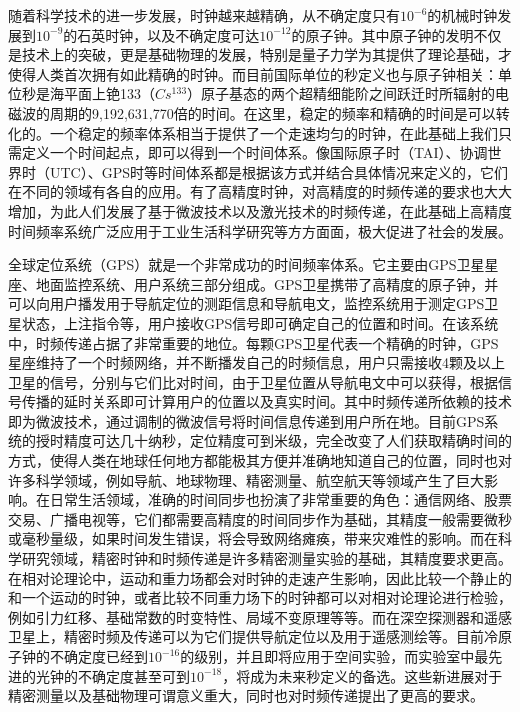 随着科学技术的进一步发展，时钟越来越精确，从不确定度只有$10^{-6}$的机械时钟发展到$10^{-9}$的石英时钟，以及不确定度可达$10^{-12}$的原子钟。其中原子钟的发明不仅是技术上的突破，更是基础物理的发展，特别是量子力学为其提供了理论基础，才使得人类首次拥有如此精确的时钟。而目前国际单位的秒定义也与原子钟相关：单位秒是海平面上铯133（$Cs^{133}$）原子基态的两个超精细能阶之间跃迁时所辐射的电磁波的周期的9,192,631,770倍的时间。在这里，稳定的频率和精确的时间是可以转化的。一个稳定的频率体系相当于提供了一个走速均匀的时钟，在此基础上我们只需定义一个时间起点，即可以得到一个时间体系。像国际原子时（TAI）、协调世界时（UTC）、GPS时等时间体系都是根据该方式并结合具体情况来定义的，它们在不同的领域有各自的应用。有了高精度时钟，对高精度的时频传递的要求也大大增加，为此人们发展了基于微波技术以及激光技术的时频传递，在此基础上高精度时间频率系统广泛应用于工业生活科学研究等方方面面，极大促进了社会的发展。

全球定位系统（GPS）就是一个非常成功的时间频率体系。它主要由GPS卫星星座、地面监控系统、用户系统三部分组成。GPS卫星携带了高精度的原子钟，并可以向用户播发用于导航定位的测距信息和导航电文，监控系统用于测定GPS卫星状态，上注指令等，用户接收GPS信号即可确定自己的位置和时间。在该系统中，时频传递占据了非常重要的地位。每颗GPS卫星代表一个精确的时钟，GPS星座维持了一个时频网络，并不断播发自己的时频信息，用户只需接收4颗及以上卫星的信号，分别与它们比对时间，由于卫星位置从导航电文中可以获得，根据信号传播的延时关系即可计算用户的位置以及真实时间。其中时频传递所依赖的技术即为微波技术，通过调制的微波信号将时间信息传递到用户所在地。目前GPS系统的授时精度可达几十纳秒，定位精度可到米级，完全改变了人们获取精确时间的方式，使得人类在地球任何地方都能极其方便并准确地知道自己的位置，同时也对许多科学领域，例如导航、地球物理、精密测量、航空航天等领域产生了巨大影响。在日常生活领域，准确的时间同步也扮演了非常重要的角色：通信网络、股票交易、广播电视等，它们都需要高精度的时间同步作为基础，其精度一般需要微秒或毫秒量级，如果时间发生错误，将会导致网络瘫痪，带来灾难性的影响。而在科学研究领域，精密时钟和时频传递是许多精密测量实验的基础，其精度要求更高。在相对论理论中，运动和重力场都会对时钟的走速产生影响，因此比较一个静止的和一个运动的时钟，或者比较不同重力场下的时钟都可以对相对论理论进行检验，例如引力红移、基础常数的时变特性、局域不变原理等等。而在深空探测器和遥感卫星上，精密时频及传递可以为它们提供导航定位以及用于遥感测绘等。目前冷原子钟的不确定度已经到$10^{-16}$的级别，并且即将应用于空间实验，而实验室中最先进的光钟的不确定度甚至可到$10^{-18}$，将成为未来秒定义的备选。这些新进展对于精密测量以及基础物理可谓意义重大，同时也对时频传递提出了更高的要求。


